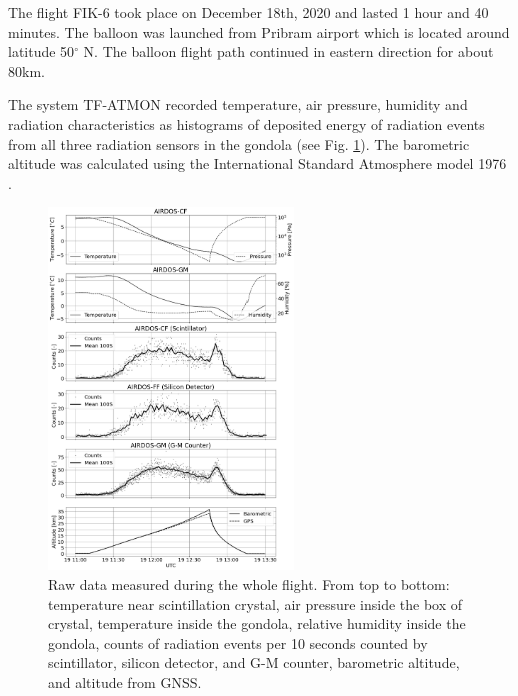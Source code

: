 \documentclass{Rpd}
\begin{document}
The flight FIK-6 took place on December 18th, 2020 and lasted 1 hour and 40 minutes. The balloon was launched from Pribram airport which is located around latitude 50$^{\circ}$ N. The balloon flight path continued in eastern direction for about 80km. 

The system TF-ATMON recorded temperature, air pressure, humidity and radiation characteristics as histograms of deposited energy of radiation events from all three radiation sensors in the gondola (see Fig. \ref{FIK-6_RAW_data}). The barometric altitude was calculated using the International Standard Atmosphere model 1976 \cite{standard_atmosphere}. 


\begin{figure}%
	\centerline{\includegraphics[width=65mm]{img/FIK-6_RAW_data.png}}
	\caption{Raw data measured during the whole flight. From top to bottom: temperature near scintillation crystal, air pressure inside the box of crystal, temperature inside the gondola, relative humidity inside the gondola, counts of radiation events per 10 seconds counted by scintillator, silicon detector, and  G-M counter, barometric altitude, and altitude from GNSS.\label{FIK-6_RAW_data}}
\end{figure}
\end{document}

